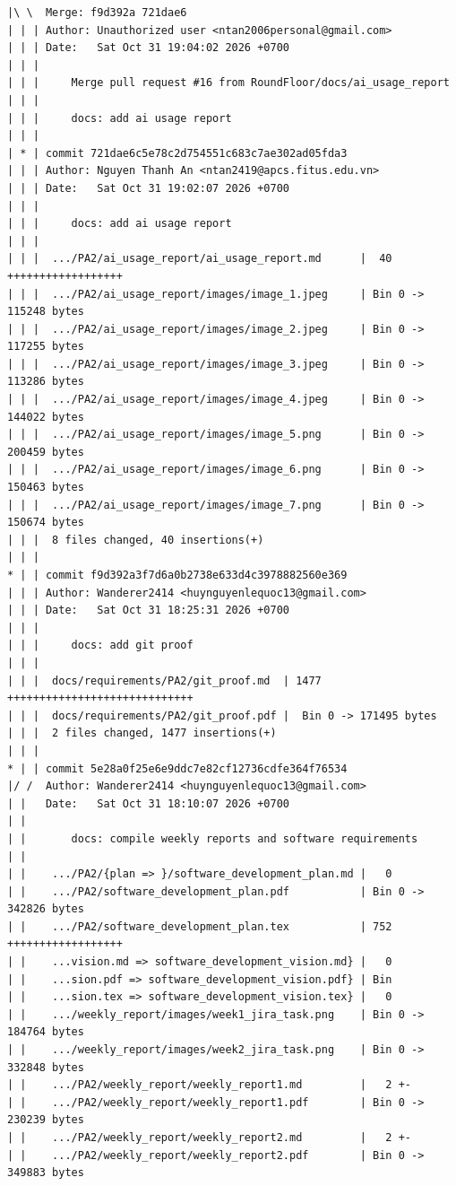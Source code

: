 \documentclass[12pt]{article}
\begin{document}
\begin{lstlisting}[numbers=none,breaklines=true]
|\ \  Merge: f9d392a 721dae6
| | | Author: Unauthorized user <ntan2006personal@gmail.com>
| | | Date:   Sat Oct 31 19:04:02 2026 +0700
| | |
| | |     Merge pull request #16 from RoundFloor/docs/ai_usage_report
| | |
| | |     docs: add ai usage report
| | |
| * | commit 721dae6c5e78c2d754551c683c7ae302ad05fda3
| | | Author: Nguyen Thanh An <ntan2419@apcs.fitus.edu.vn>
| | | Date:   Sat Oct 31 19:02:07 2026 +0700
| | |
| | |     docs: add ai usage report
| | |
| | |  .../PA2/ai_usage_report/ai_usage_report.md      |  40 ++++++++++++++++++
| | |  .../PA2/ai_usage_report/images/image_1.jpeg     | Bin 0 -> 115248 bytes
| | |  .../PA2/ai_usage_report/images/image_2.jpeg     | Bin 0 -> 117255 bytes
| | |  .../PA2/ai_usage_report/images/image_3.jpeg     | Bin 0 -> 113286 bytes
| | |  .../PA2/ai_usage_report/images/image_4.jpeg     | Bin 0 -> 144022 bytes
| | |  .../PA2/ai_usage_report/images/image_5.png      | Bin 0 -> 200459 bytes
| | |  .../PA2/ai_usage_report/images/image_6.png      | Bin 0 -> 150463 bytes
| | |  .../PA2/ai_usage_report/images/image_7.png      | Bin 0 -> 150674 bytes
| | |  8 files changed, 40 insertions(+)
| | |
* | | commit f9d392a3f7d6a0b2738e633d4c3978882560e369
| | | Author: Wanderer2414 <huynguyenlequoc13@gmail.com>
| | | Date:   Sat Oct 31 18:25:31 2026 +0700
| | |
| | |     docs: add git proof
| | |
| | |  docs/requirements/PA2/git_proof.md  | 1477 +++++++++++++++++++++++++++++
| | |  docs/requirements/PA2/git_proof.pdf |  Bin 0 -> 171495 bytes
| | |  2 files changed, 1477 insertions(+)
| | |
* | | commit 5e28a0f25e6e9ddc7e82cf12736cdfe364f76534
|/ /  Author: Wanderer2414 <huynguyenlequoc13@gmail.com>
| |   Date:   Sat Oct 31 18:10:07 2026 +0700
| |
| |       docs: compile weekly reports and software requirements
| |
| |    .../PA2/{plan => }/software_development_plan.md |   0
| |    .../PA2/software_development_plan.pdf           | Bin 0 -> 342826 bytes
| |    .../PA2/software_development_plan.tex           | 752 ++++++++++++++++++
| |    ...vision.md => software_development_vision.md} |   0
| |    ...sion.pdf => software_development_vision.pdf} | Bin
| |    ...sion.tex => software_development_vision.tex} |   0
| |    .../weekly_report/images/week1_jira_task.png    | Bin 0 -> 184764 bytes
| |    .../weekly_report/images/week2_jira_task.png    | Bin 0 -> 332848 bytes
| |    .../PA2/weekly_report/weekly_report1.md         |   2 +-
| |    .../PA2/weekly_report/weekly_report1.pdf        | Bin 0 -> 230239 bytes
| |    .../PA2/weekly_report/weekly_report2.md         |   2 +-
| |    .../PA2/weekly_report/weekly_report2.pdf        | Bin 0 -> 349883 bytes

\end{lstlisting}
\end{document}
